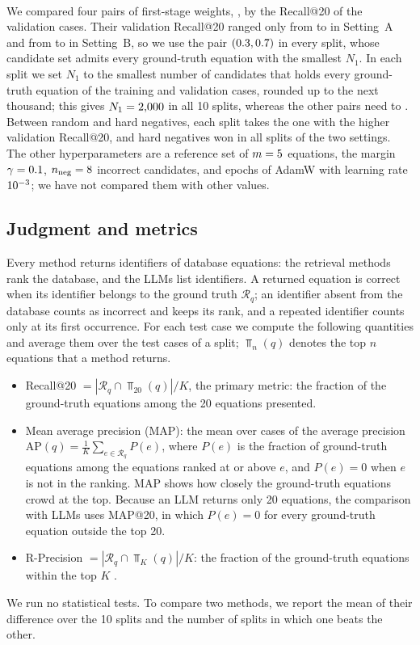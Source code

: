\paragraph{\ours} We compared four pairs of first-stage weights, \StagePairs, by the
Recall@20 of the validation cases. Their validation
Recall@20 ranged only from \ValRecAMin{} to \ValRecAMax{} in Setting~A and from \ValRecBMin{} to
\ValRecBMax{} in Setting~B, so we use the pair $(0.3, 0.7)$ in every split, whose candidate set
admits every ground-truth equation with the smallest $N_1$. In each split we set $N_1$ to the
smallest number of candidates that holds every ground-truth equation of the training and validation
cases, rounded up to the next thousand; this gives $N_1 = 2{,}000$ in all 10 splits, whereas the
other pairs need \NOneOtherMin{} to \NOneOtherMax. Between random and hard negatives, each split
takes the one with the higher validation Recall@20, and hard negatives won in all \NSplitsAll{}
splits of the two settings. The other hyperparameters are a reference set of $m = 5$
equations, the margin $\gamma = 0.1$, $n_{\mathrm{neg}} = 8$ incorrect candidates, and
\Epochs{} epochs of AdamW with learning rate $10^{-3}$; we have not compared them with other
values.

\subsection{Judgment and metrics}\label{sec:metrics}

Every method returns identifiers of database equations: the retrieval methods rank the database,
and the LLMs list identifiers. A returned equation is correct when its identifier belongs to the
ground truth $\mathcal{R}_q$; an identifier absent from the database counts as incorrect and keeps
its rank, and a repeated identifier counts only at its first occurrence. For each test case we
compute the following quantities and average them over the test cases of a split;
$\Top_n(q)$ denotes the top $n$ equations that a method returns.
\begin{itemize}
  \item Recall@20 $= |\mathcal{R}_q \cap \Top_{20}(q)| / K$, the primary metric: the fraction of
    the ground-truth equations among the 20 equations presented.
  \item Mean average precision (MAP): the mean over cases of the average precision
    $\mathrm{AP}(q) = \frac{1}{K} \sum_{e \in \mathcal{R}_q} P(e)$, where $P(e)$ is the fraction of
    ground-truth equations among the equations ranked at or above $e$, and $P(e) = 0$ when $e$ is
    not in the ranking. MAP shows how closely the ground-truth equations crowd at the top. Because
    an LLM returns only 20 equations, the comparison with LLMs uses MAP@20, in which $P(e) = 0$ for
    every ground-truth equation outside the top 20.
  \item R-Precision $= |\mathcal{R}_q \cap \Top_K(q)| / K$: the fraction of the ground-truth
    equations within the top $K$ \citep{Manning}.
\end{itemize}
We run no statistical tests. To compare two methods, we report the mean of their difference over
the 10 splits and the number of splits in which one beats the other.

